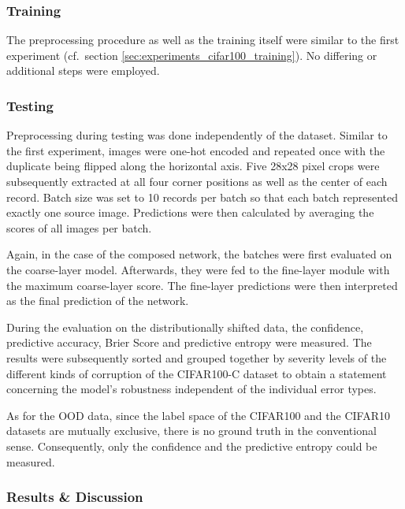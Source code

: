 \clearpage

\subsubsection{Training%
               \label{sec:experiments_uncertainty_training}}
               
The preprocessing procedure as well as the training itself were similar to the first experiment (cf.\ section \ref{sec:experiments_cifar100_training}). No differing or additional steps were employed.
               
\subsubsection{Testing%
               \label{sec:experiments_uncertainty_testing}}

Preprocessing during testing was done independently of the dataset. Similar to the first experiment, images were one-hot encoded and repeated once with the duplicate being flipped along the horizontal axis. Five 28x28 pixel crops were subsequently extracted at all four corner positions as well as the center of each record. Batch size was set to 10 records per batch so that each batch represented exactly one source image. Predictions were then calculated by averaging the scores of all images per batch.

Again, in the case of the composed network, the batches were first evaluated on the coarse-layer model. Afterwards, they were fed to the fine-layer module with the maximum coarse-layer score. The fine-layer predictions were then interpreted as the final prediction of the network.

During the evaluation on the distributionally shifted data, the confidence, predictive accuracy, Brier Score and predictive entropy were measured. The results were subsequently sorted and grouped together by severity levels of the different kinds of corruption of the CIFAR100-C dataset to obtain a statement concerning the model's robustness independent of the individual error types.

As for the OOD data, since the label space of the CIFAR100 and the CIFAR10 datasets are mutually exclusive, there is no ground truth in the conventional sense. Consequently, only the confidence and the predictive entropy could be measured.

\subsubsection{Results \& Discussion%
               \label{sec:experiments_uncertainty_results}}

